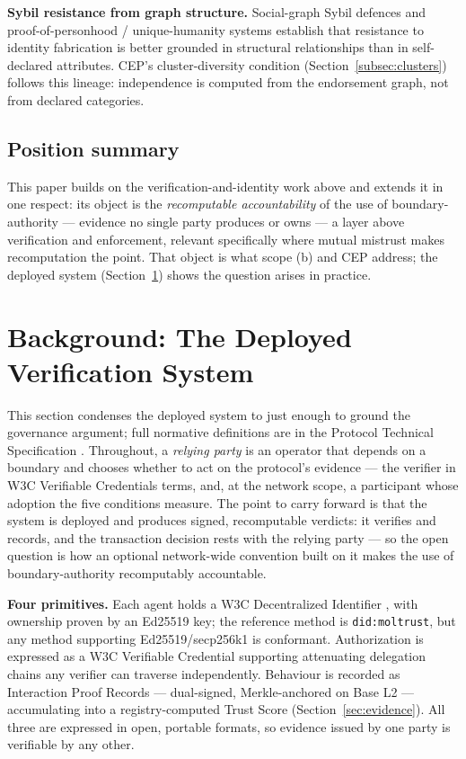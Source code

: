 \textbf{Sybil resistance from graph structure.} Social-graph Sybil defences \cite{ref40_sybilguard} and proof-of-personhood / unique-humanity systems \cite{ref41_brightid} establish that resistance to identity fabrication is better grounded in structural relationships than in self-declared attributes. CEP's cluster-diversity condition (Section~\ref{subsec:clusters}) follows this lineage: independence is computed from the endorsement graph, not from declared categories.

\subsection{Position summary}

This paper builds on the verification-and-identity work above and extends it in one respect: its object is the \emph{recomputable accountability} of the use of boundary-authority — evidence no single party produces or owns — a layer above verification and enforcement, relevant specifically where mutual mistrust makes recomputation the point. That object is what scope (b) and CEP address; the deployed system (Section~\ref{sec:background}) shows the question arises in practice.

\section{Background: The Deployed Verification System}
\label{sec:background}

This section condenses the deployed system to just enough to ground the governance argument; full normative definitions are in the Protocol Technical Specification \cite{ref28_techspec}. Throughout, a \emph{relying party} is an operator that depends on a boundary and chooses whether to act on the protocol's evidence — the verifier in W3C Verifiable Credentials terms, and, at the network scope, a participant whose adoption the five conditions measure. The point to carry forward is that the system is deployed and produces signed, recomputable verdicts: it verifies and records, and the transaction decision rests with the relying party — so the open question is how an optional network-wide convention built on it makes the use of boundary-authority recomputably accountable.

\textbf{Four primitives.} Each agent holds a W3C Decentralized Identifier \cite{ref6_w3cdid}, with ownership proven by an Ed25519 key; the reference method is \texttt{did:moltrust}, but any method supporting Ed25519/secp256k1 is conformant. Authorization is expressed as a W3C Verifiable Credential \cite{ref7_w3cvc} supporting attenuating delegation chains any verifier can traverse independently. Behaviour is recorded as Interaction Proof Records — dual-signed, Merkle-anchored on Base L2 — accumulating into a registry-computed Trust Score (Section~\ref{sec:evidence}). All three are expressed in open, portable formats, so evidence issued by one party is verifiable by any other.

